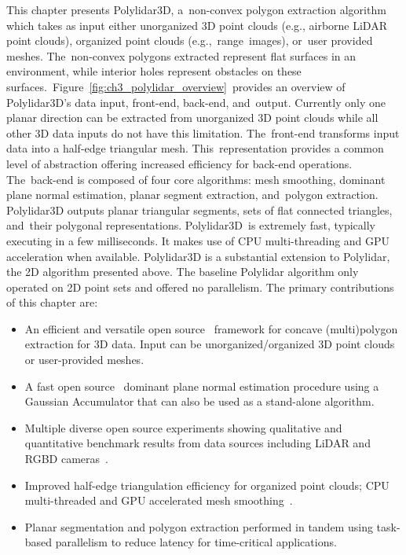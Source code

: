 This chapter presents Polylidar3D, a~non-convex polygon extraction algorithm which takes as input either unorganized 3D point clouds (e.g., airborne LiDAR point clouds), organized point clouds (e.g.,~range~images), or~user provided meshes. The~non-convex polygons extracted represent flat surfaces in an environment, while interior holes represent obstacles on these surfaces.~Figure~\ref{fig:ch3_polylidar_overview}~provides an overview of Polylidar3D's data input, front-end, back-end, and~output.  Currently only one planar direction can be extracted from unorganized 3D point clouds while all other 3D data inputs do not have this limitation. The~front-end transforms input data into a half-edge triangular mesh.  This~representation provides a common level of abstraction offering increased efficiency for back-end operations. The~back-end is composed of four core algorithms: mesh smoothing, dominant plane normal estimation, planar segment extraction, and~polygon extraction.  Polylidar3D outputs planar triangular segments, sets of flat connected triangles, and~their polygonal representations. Polylidar3D~is extremely fast, typically executing in a few milliseconds. It makes use of CPU multi-threading and \ac{GPU} acceleration when available. Polylidar3D is a substantial extension to Polylidar, the 2D algorithm presented above. The baseline Polylidar algorithm only operated on 2D point sets and offered no parallelism. 
The primary contributions of this chapter are:

\begin{itemize}
  \item An efficient and versatile open source~\cite{Castagno_Github_Polylidar} framework for concave (multi)polygon extraction for 3D data. Input can be unorganized/organized 3D point clouds or user-provided meshes.
  \item A fast open source~\cite{Castagno_Github_fastga} dominant plane normal estimation procedure using a Gaussian Accumulator that can also be used as a stand-alone algorithm.
  \item Multiple diverse open source experiments showing qualitative and quantitative benchmark results from data sources including LiDAR and \ac{RGBD} cameras~\cite{Castagno_Github_Polylidar3D_Kitti, Castagno_Github_Polylidar3D_RealSense, Castagno_Github_Polylidar_Synpeb}.
  \item Improved half-edge triangulation efficiency for organized point clouds; CPU multi-threaded and \ac{GPU} accelerated mesh smoothing~\cite{Castagno_Github_opf}. 
  \item Planar segmentation and polygon extraction performed in tandem using task-based parallelism to reduce latency for time-critical applications. 
\end{itemize}

